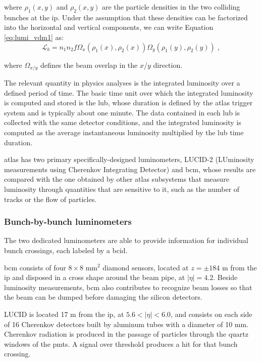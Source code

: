 \noindent where $\rho_1(x,y)$ and $\rho_2(x,y)$ are the particle densities in the two colliding bunches at the \gls{ip}. 
Under the assumption that these densities can be factorized into the horizontal and vertical components, we can write Equation \ref{eq:lumi_vdm1} as:
\begin{equation}
\mathcal{L}_b = n_1 n_2 f  \Omega_x(\rho_1(x), \rho_2(x)) \Omega_y(\rho_1(y), \rho_2(y))  \; , \nonumber
\label{eq:lumi_vdm2}
\end{equation}

\noindent where $\Omega_{x/y}$ defines the beam overlap in the $x$/$y$ direction.

The relevant quantity in physics analyses is the integrated luminosity over a defined period of time. The basic time unit over which the integrated luminosity is computed and stored is the \gls{lub}, whose duration is defined by the \gls{atlas} trigger system and is typically about one minute. The data contained in each \gls{lub} is collected with the same detector conditions, and the integrated luminosity is computed as the average instantaneous luminosity multiplied by the \gls{lub} time duration.

\gls{atlas} has two primary specifically-designed luminometers, LUCID-2 (LUminosity measurements using Cherenkov Integrating Detector) and \gls{bcm}, whose results are compared with the one obtained by other \gls{atlas} subsystems that measure luminosity through quantities that are sensitive to it, such as the number of tracks or the flow of particles.

\subsubsection*{Bunch-by-bunch luminometers}

The two dedicated luminometers are able to provide information for individual bunch crossings, each labeled by a \gls{bcid}.

\gls{bcm} consists of four $8 \times 8$ mm$^2$ diamond sensors, located at $z= \pm 184$ m from the \gls{ip} and disposed in a cross shape around the beam pipe, at $|\eta| = 4.2$. Beside luminosity measurements, \gls{bcm} also contributes to recognize beam losses so that the beam can be dumped before damaging the silicon detectors. 

LUCID is located 17 m from the \gls{ip}, at $5.6 < |\eta| < 6.0$, and consists on each side of 16 Cherenkov detectors built by aluminum tubes with a diameter of 10 mm. Cherenkov radiation is produced in the passage of particles through the quartz windows of the \glspl{pmt}. A signal over threshold produces a hit for that bunch crossing.

